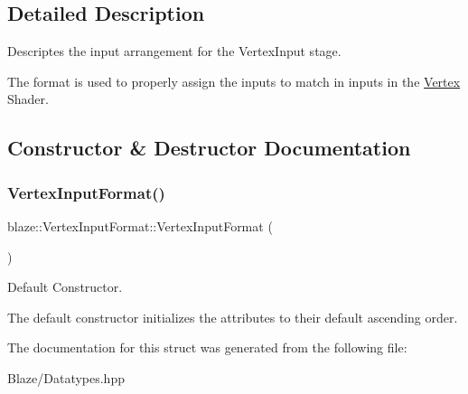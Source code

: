 \subsection{Detailed Description}
Descriptes the input arrangement for the Vertex\+Input stage. 

The format is used to properly assign the inputs to match in inputs in the \hyperlink{structblaze_1_1Vertex}{Vertex} Shader. 

\subsection{Constructor \& Destructor Documentation}
\mbox{\label{structblaze_1_1VertexInputFormat_a303f81c990469ace47c11051105434fe}} 
\subsubsection{\texorpdfstring{Vertex\+Input\+Format()}{VertexInputFormat()}}
{\footnotesize\ttfamily blaze\+::\+Vertex\+Input\+Format\+::\+Vertex\+Input\+Format (\begin{DoxyParamCaption}{ }\end{DoxyParamCaption})\hspace{0.3cm}{\ttfamily [inline]}}



Default Constructor. 

The default constructor initializes the attributes to their default ascending order. 

The documentation for this struct was generated from the following file\+:\begin{DoxyCompactItemize}
\item 
Blaze/Datatypes.\+hpp\end{DoxyCompactItemize}
